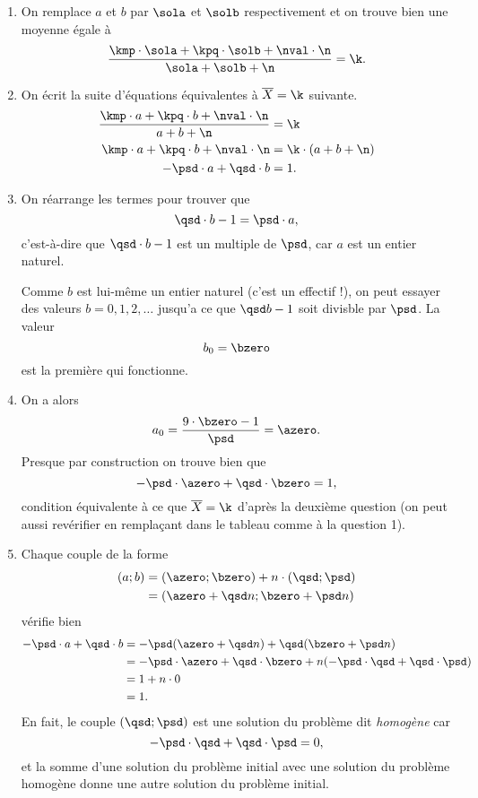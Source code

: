 {
	\begin{enumerate}
		\item
		On remplace $a$ et $b$ par $\sola$ et $\solb$ respectivement et on trouve bien une moyenne égale à
			\[ \dfrac{\kmp\cdot\sola + \kpq\cdot\solb+\nval\cdot\n}{\sola+\solb+\n} = \k. \]
		
		\item 
		On écrit la suite d'équations équivalentes à $\overline{X} = \k$ suivante.
			\begin{align*}
				\dfrac{\kmp\cdot a + \kpq\cdot b+\nval\cdot\n}{a + b+\n} &= \k \\
				\kmp\cdot a + \kpq\cdot b+\nval\cdot\n &= \k \cdot (a+b+\n) \\
				 - \psd \cdot a + \qsd \cdot b &= 1.
			\end{align*}
		
		\item
		On réarrange les termes pour trouver que 
			\[ \qsd \cdot b - 1 = \psd \cdot a, \]
		c'est-à-dire que $\qsd\cdot b - 1$ est un multiple de $\psd$, car $a$ est un entier naturel.
		
		Comme $b$ est lui-même un entier naturel (c'est un effectif !), on peut essayer des valeurs $b=0, 1, 2, \dots$ jusqu'a ce que $\qsd b -1$ soit divisble par $\psd$.
		La valeur
			\[ b_0 = \bzero \]
		est la première qui fonctionne.
		
		\item
		On a alors
			\[ a_0 = \dfrac{9 \cdot \bzero - 1}{\psd} = \azero. \]
		Presque par construction on trouve bien que 
			\[ -\psd \cdot \azero  + \qsd \cdot \bzero = 1, \]
		condition équivalente à ce que $\overline{X} = \k$ d'après la deuxième question (on peut aussi revérifier en remplaçant dans le tableau comme à la question 1).
		
		\item
		Chaque couple de la forme
			\begin{align*}
				(a;b) &= (\azero; \bzero) + n \cdot (\qsd ; \psd) \\
					&= (\azero+ \qsd n ; \bzero + \psd n )
			\end{align*}
		vérifie bien
			\begin{align*}
				 - \psd \cdot a + \qsd \cdot b &= - \psd (\azero + \qsd n ) + \qsd (\bzero + \psd n ) \\
				 							&= -\psd \cdot \azero +  \qsd \cdot \bzero + n (- \psd \cdot \qsd + \qsd \cdot \psd) \\
				 							&= 1 + n \cdot 0 \\
				 							&= 1.
			\end{align*}
		En fait, le couple $(\qsd; \psd)$ est une solution du problème dit \emph{homogène} car
			\[ -\psd \cdot \qsd + \qsd \cdot \psd = 0, \]
		et la somme d'une solution du problème initial avec une solution du problème homogène donne une autre solution du problème initial.
		

\end{enumerate}}
